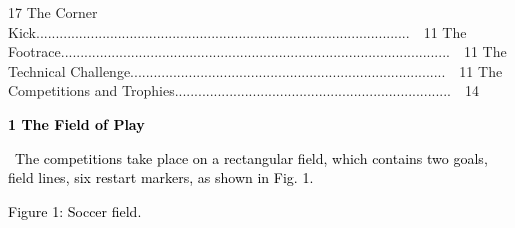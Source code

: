\documentclass[a4paper]{article}
\begin{document}
{17 The Corner
Kick................................................................................................\ \ 11 The
Footrace....................................................................................................\ \ 11 The Technical
Challenge.................................................................................\ \ 11 The Competitions and Trophies.......................................................................\ \ 14}


\bigskip


\bigskip
\newpage

\textbf{\textcolor{black}{1 The Field of Play}}

\textcolor{black}{\ The competitions take place on a rectangular field, which contains two goals, field lines, six
restart markers, as shown in Fig. 1.}

\textcolor{black}{Figure 1: Soccer field.}
\newline
 
\end{document}
